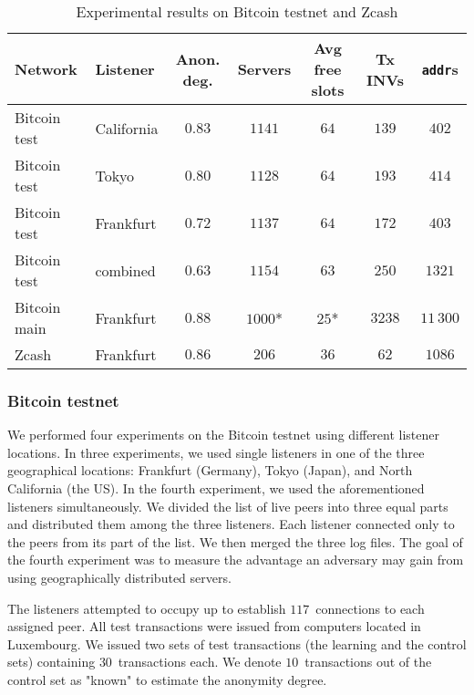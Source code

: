 \begin{table*}[!t]
	\normalsize
	\caption{Experimental results on Bitcoin testnet and Zcash}
	\centering
	\begin{tabular}{ | l | l | c | c | c | c | c | }
		\hline
		Network & Listener & Anon. deg. & Servers & Avg free slots & Tx INVs & \texttt{addr}s \\
		\hline
		Bitcoin test & California & $0.83$ & $1141$ & $64$ & $139$ & $402$ \\
		Bitcoin test & Tokyo & $0.80$ & $1128$ & $64$ & $193$ & $414$ \\
		Bitcoin test & Frankfurt & $0.72$ & $1137$ & $64$ & $172$ & $403$ \\
		Bitcoin test & combined & $0.63$ & $1154$ & $63$ & $250$ & $1321$ \\
		Bitcoin main & Frankfurt & $0.88$ & $1000$* & $25$* & $3238$ & $11\,300$ \\
		Zcash & Frankfurt & $0.86$ & $206$ & $36$ & $62$ & $1086$ \\
		\hline
	\end{tabular}
	\label{tab:results}
\end{table*}

\subsubsection{Bitcoin testnet}

We performed four experiments on the Bitcoin testnet using different listener locations.
In three experiments, we used single listeners in one of the three geographical locations: Frankfurt (Germany), Tokyo (Japan), and North California (the US).
In the fourth experiment, we used the aforementioned listeners simultaneously.
We divided the list of live peers into three equal parts and distributed them among the three listeners.
Each listener connected only to the peers from its part of the list.
We then merged the three log files.
The goal of the fourth experiment was to measure the advantage an adversary may gain from using geographically distributed servers.

The listeners attempted to occupy up to establish $117$~connections to each assigned peer.
All test transactions were issued from computers located in Luxembourg.
We issued two sets of test transactions (the learning and the control sets) containing $30$~transactions each.
We denote $10$~transactions out of the control set as "known" to estimate the anonymity degree.

